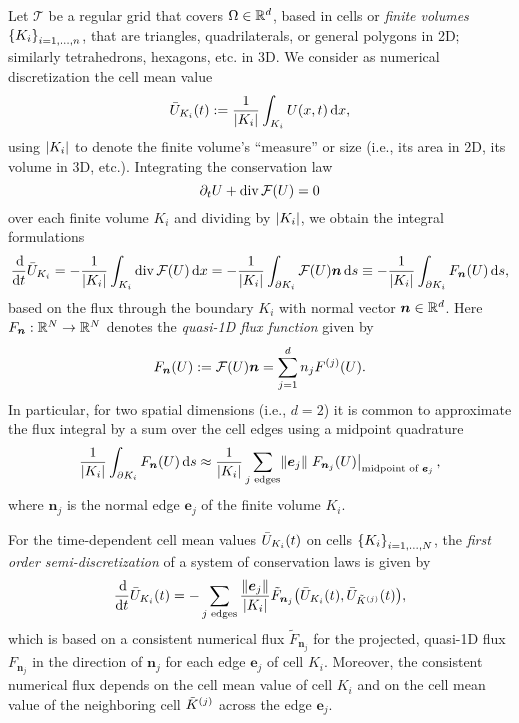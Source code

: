 Let \(\mathcal{T}\) be a regular grid that covers \(\Omega \in \R^d\), based in cells or \emph{finite volumes} \(\braces*{K_i}_{i = 1, \ldots, n}\), that are triangles, quadrilaterals, or general polygons in 2D; similarly tetrahedrons, hexagons, etc. in 3D.
We consider as numerical discretization the cell mean value
\[
	\bar{U}_{K_i}\parentheses*{t} := \frac{1}{\absolute*{K_i}}\int_{K_i}U\parentheses*{x, t}\d x,
\]
using \(\absolute*{K_i}\) to denote the finite volume's ``measure'' or size (i.e., its area in 2D, its volume in 3D, etc.).
Integrating the conservation law
\[
	\partial_t U + \div\mathcal{F}\parentheses*{U} = 0
\]
over each finite volume \(K_i\) and dividing by \(\absolute*{K_i}\), we obtain the integral formulations
\[
	\frac{\d}{\d t}\bar{U}_{K_i} = -\frac{1}{\absolute*{K_i}}\int_{K_i}\div\mathcal{F}\parentheses*{U}\d x = -\frac{1}{\absolute*{K_i}}\int_{\partial K_i}\mathcal{F}\parentheses*{U}\bm{n}\d s \equiv -\frac{1}{\absolute*{K_i}}\int_{\partial K_i}F_{\bm{n}}\parentheses*{U}\d s,
\]
based on the flux through the boundary \(K_i\) with normal vector \(\bm{n} \in \R^d\).
Here \(F_{\bm{n}}: \R^N \to \R^N\) denotes the \emph{quasi-1D flux function} given by
\[
	F_{\bm{n}}\parentheses*{U} := \mathcal{F}\parentheses*{U}\bm{n} = \sum_{j = 1}^d n_j F^{\parentheses*{j}}\parentheses*{U}.
\]
In particular, for two spatial dimensions (i.e., \(d = 2\)) it is common to approximate the flux integral by a sum over the cell edges using a midpoint quadrature
\[
	\frac{1}{\absolute*{K_i}}\int_{\partial K_i}F_{\bm{n}}\parentheses*{U}\d s \approx \frac{1}{\absolute*{K_i}}\sum_{j\text{ edges}}\norm*{\bm{e}_j}\left.F_{\bm{n}_j}\parentheses*{U}\right|_{\text{midpoint of }\bm{e}_j},
\]
where \(\bm{n}_j\) is the normal edge \(\bm{e}_j\) of the finite volume \(K_i\).
\begin{center}
\end{center}

\begin{definition}
	For the time-dependent cell mean values \(\bar{U}_{K_i}\parentheses*{t}\) on cells \(\braces*{K_i}_{i = 1, \ldots, N}\), the \emph{first order semi-discretization} of a system of conservation laws is given by
	\[
		\frac{\d}{\d t}\bar{U}_{K_i}\parentheses*{t} = -\sum_{j\text{ edges}}\frac{\norm*{\bm{e}_j}}{\absolute*{K_i}}\tilde{F}_{\bm{n}_j}\parentheses*{\bar{U}_{K_i}\parentheses*{t}, \bar{U}_{\tilde{K}^{\parentheses*{j}}}\parentheses*{t}},
	\]
	which is based on a consistent numerical flux \(\tilde{F}_{\bm{n}_j}\) for the projected, quasi-1D flux \(F_{\bm{n}_j}\) in the direction of \(\bm{n}_j\) for each edge \(\bm{e}_j\) of cell \(K_i\).
	Moreover, the consistent numerical flux depends on the cell mean value of cell \(K_i\) and on the cell mean value of the neighboring cell \(\tilde{K}^{\parentheses*{j}}\) across the edge \(\bm{e}_j\).
\end{definition}

